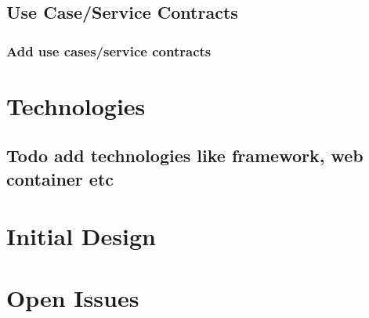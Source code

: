 \documentclass{article}
\begin{document}
\subsection{Use Case/Service Contracts}

\subsubsection{Add use cases/service contracts}

\section{Technologies}

\subsection{Todo add technologies like framework, web container etc}

\section{Initial Design}

\section{Open Issues}
\end{document}
